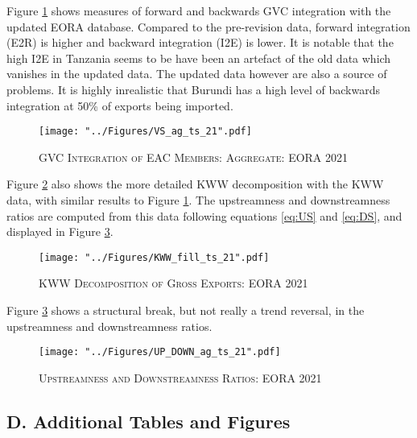 \documentclass[a4paper]{article}
\begin{document}
Figure \ref{fig:VSag_ts_21} shows measures of forward and backwards GVC integration with the updated EORA database. Compared to the pre-revision data, forward integration (E2R) is higher and backward integration (I2E) is lower. It is notable that the high I2E in Tanzania seems to be have been an artefact of the old data which vanishes in the updated data. The updated data however are also a source of problems. It is highly inrealistic that Burundi has a high level of backwards integration at 50\% of exports being imported. 

\begin{figure}[h!]
\centering
\caption{\label{fig:VSag_ts_21}\textsc{GVC Integration of EAC Members: Aggregate: EORA 2021}}
\texttt{[image: "../Figures/VS\_ag\_ts\_21".pdf]} %
\end{figure}
\FloatBarrier

Figure \ref{fig:KWW_fill_ts_21} also shows the more detailed KWW decomposition with the KWW data, with similar results to Figure \ref{fig:VSag_ts_21}. The upstreamness and downstreamness ratios are computed from this data following equations \ref{eq:US} and \ref{eq:DS}, and displayed in Figure \ref{fig:UP_DOWN_ag_ts_21}.


\begin{figure}[h!]
\centering
\caption{\label{fig:KWW_fill_ts_21}\textsc{KWW Decomposition of Gross Exports: EORA 2021}}
\texttt{[image: "../Figures/KWW\_fill\_ts\_21".pdf]} %
\end{figure}
\FloatBarrier

Figure \ref{fig:UP_DOWN_ag_ts_21} shows a structural break, but not really a trend reversal, in the upstreamness and downstreamness ratios. 

\begin{figure}[h!] %
\centering
\caption{\label{fig:UP_DOWN_ag_ts_21}\textsc{Upstreamness and Downstreamness Ratios: EORA 2021}}
\texttt{[image: "../Figures/UP\_DOWN\_ag\_ts\_21".pdf]} %
\end{figure} 
\FloatBarrier 


\subsection*{D. Additional Tables and Figures}
\setcounter{table}{0}
\renewcommand{\thetable}{D\arabic{table}}
\setcounter{figure}{0}
\renewcommand{\thefigure}{D\arabic{figure}}
\end{document}
